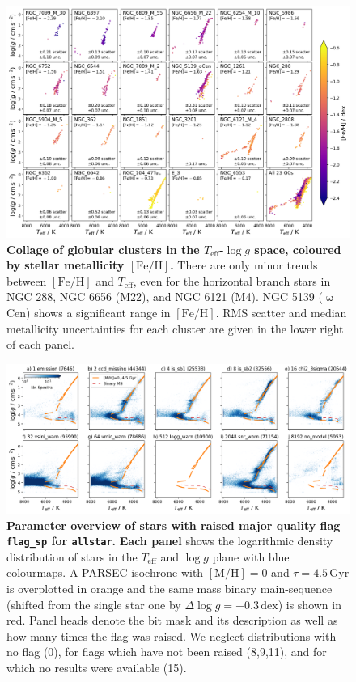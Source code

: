 \documentclass[
  journal=pasa,
  manuscript=research-paper, %
  year=2024,
  volume=37
]{cup-journal}
\newcommand{\Teff}{$T_\mathrm{eff}$\xspace}
\newcommand{\logg}{$\log g$\xspace}
\newcommand{\feh}{$\mathrm{[Fe/H]}$\xspace}
\begin{document}
\begin{figure}
\includegraphics[width=\textwidth]{figures/galah_dr4_gcs_teff_logg.png}
\caption{
\textbf{Collage of globular clusters in the \Teff-\logg space, coloured by stellar metallicity \feh.} There are only minor trends between \feh and \Teff, even for the horizontal branch stars in NGC 288, NGC 6656 (M22), and NGC 6121 (M4). NGC 5139 ($\upomega$Cen) shows a significant range in \feh. RMS scatter and median metallicity uncertainties for each cluster are given in the lower right of each panel.}
\label{fig:galah_dr4_gcs_teff_logg}
\end{figure}

\begin{figure}[ht]
 \centering
 \includegraphics[width=\textwidth]{figures/flag_sp_overview_allstar.png}
 \caption{\textbf{Parameter overview of stars with raised major quality flag \texttt{flag\_sp} for \texttt{allstar}.}
 \textbf{Each panel} shows the logarithmic density distribution of stars in the \Teff and \logg plane with blue colourmaps. A PARSEC isochrone with $\mathrm{[M/H]}=0$ and $\tau = 4.5\,\mathrm{Gyr}$ is overplotted in orange and the same mass binary main-sequence (shifted from the single star one by $\Delta \log g = -0.3\,\mathrm{dex}$) is shown in red. Panel heads denote the bit mask and its description as well as how many times the flag was raised. We neglect distributions with no flag (0), for flags which have not been raised (8,9,11), and for which no results were available (15).} \label{fig:flag_sp_overview_allstar}
\end{figure}
\end{document}
